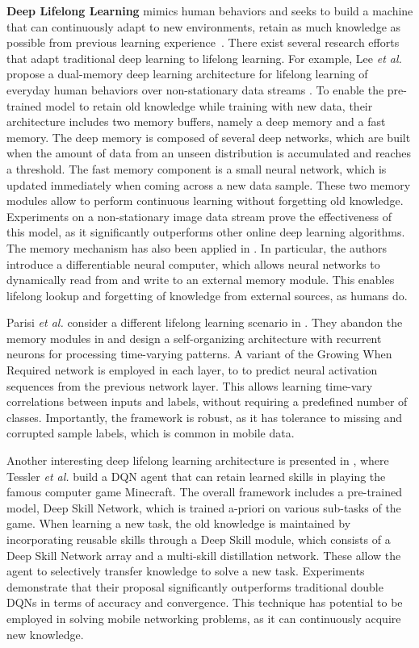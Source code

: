\documentclass[journal,comsoc,letter]{IEEEtran}
\begin{document}
\noindent \textbf{Deep Lifelong Learning} mimics human behaviors and seeks to build a machine that can continuously adapt to new environments, retain as much knowledge as possible from previous learning experience~\cite{chen2016lifelong}.
There exist several research efforts that adapt traditional deep learning to lifelong learning. For example, Lee \emph{et al.} propose a dual-memory deep learning architecture for lifelong learning of everyday human behaviors over non-stationary data streams \cite{lee2016dual}. To enable the pre-trained model to retain old knowledge while training with new data, their architecture includes two memory buffers, namely a deep memory and a fast memory. The deep memory is composed of several deep networks, which are built when the amount of data from an unseen distribution is accumulated and reaches a threshold. The fast memory component is a small neural network, which is updated immediately when coming across a new data sample. These two memory modules allow to perform continuous learning without forgetting old knowledge. Experiments on a non-stationary image data stream prove the effectiveness of this model, as it significantly outperforms other online deep learning algorithms. The memory mechanism has also been applied in \cite{graves2016hybrid}. In particular, the authors introduce a differentiable neural computer, which allows neural networks to dynamically read from and write to an external memory module. This enables lifelong lookup and forgetting of knowledge from external sources, as humans do.

Parisi \emph{et al.} consider a different lifelong learning scenario in \cite{parisi2017lifelong}. They abandon the memory modules in \cite{lee2016dual} and design a self-organizing architecture with recurrent neurons for processing time-varying patterns. A variant of the Growing When Required network is employed in each layer, to to predict neural activation sequences from the previous network layer. This allows learning time-vary correlations between inputs and labels, without requiring a predefined number of classes. Importantly, the framework is robust, as it has tolerance to missing and corrupted sample labels, which is common in mobile data.

Another interesting deep lifelong learning architecture is presented in \cite{tessler2017deep}, where Tessler \emph{et al.} build a DQN agent that can retain learned skills in playing the famous computer game Minecraft. The overall framework includes a pre-trained model, Deep Skill Network, which is trained a-priori on various sub-tasks of the game. When learning a new task, the old knowledge is maintained by incorporating reusable skills through a Deep Skill module, which consists of a Deep Skill Network array and a multi-skill distillation network. These allow the agent to selectively transfer knowledge to solve a new task. Experiments demonstrate that their proposal significantly outperforms traditional double DQNs in terms of accuracy and convergence. This technique has potential to be employed in solving mobile networking problems, as it can continuously acquire new knowledge.\\
\end{document}
